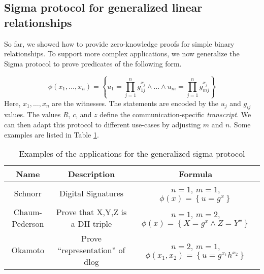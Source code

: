 \subsection{Sigma protocol for generalized linear relationships}

So far, we showed how to provide zero-knowledge proofs for simple binary relationships.
To support more complex applications, we now generalize the Sigma protocol to prove predicates of the following form.

\begin{equation*}
    \phi(x_1, \dots, x_n) = \left\{ u_1 = \prod_{j=1}^{n} g_{1j}^{x_j} \land \dots \land u_m  = \prod_{j=1}^{n} g_{mj}^{x_j}\right\}
\end{equation*}
Here, $x_1, \dots, x_n$ are the witnesses. The statements are encoded by the $u_j$ and $g_{ij}$ values.
The values $R$, $c$, and $z$ define the communication-specific \emph{transcript}.
We can then adapt this protocol to different use-cases by adjusting $m$ and $n$. Some examples are listed in Table \ref{tab:sigmaexamples}.

\begin{table}[h]
\begin{tabular}{|c|c|c|}
\hline
    \textbf{Name} & \textbf{Description} & \textbf{Formula} \\
\hline
    Schnorr        & Digital Signatures & $n=1$, $m=1$, $\phi(x) = \left\{ u = g^x \right\}$ \\
    Chaum-Pederson & Prove that X,Y,Z is a DH triple &  $n=1$, $m=2$, $\phi(x) = \left\{ X = g^x \land Z = Y^x\right\}$ \\
    Okamoto        & Prove ``representation'' of dlog &  $n=2$, $m=1$, $\phi(x_1, x_2) = \left\{ u = g^{x_1} h^{x_2} \right\} $ \\
\hline
\end{tabular}

\caption{Examples of the applications for the generalized sigma protocol}
\label{tab:sigmaexamples}
\end{table}

